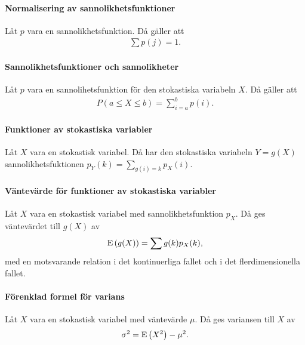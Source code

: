 \paragraph{Normalisering av sannolikhetsfunktioner}
Låt $p$ vara en sannolikhetsfunktion. Då gäller att
\begin{align*}
	\sum p(j) = 1.
\end{align*}

\proof

\paragraph{Sannolikhetsfunktioner och sannolikheter}
Låt $p$ vara en sannolihetsfunktion för den stokastiska variabeln $X$. Då gäller att
\begin{align*}
	P(a\leq X\leq b) = \sum\limits_{i = a}^{b}p(i).
\end{align*}

\proof

\paragraph{Funktioner av stokastiska variabler}
Låt $X$ vara en stokastisk variabel. Då har den stokastiska variabeln $Y = g(X)$ sannolikhetsfuktionen $p_{Y}(k) = \sum\limits_{g(i) = k}p_{X}(i)$.

\proof

\paragraph{Väntevärde för funktioner av stokastiska variabler}
Låt $X$ vara en stokastisk variabel med sannolikhetsfunktion $p_{X}$. Då ges väntevärdet till $g(X)$ av
\begin{align*}
	\text{E}\left(g(X)\right) = \sum g(k)p_{X}(k),
\end{align*}
med en motsvarande relation i det kontinuerliga fallet och i det flerdimensionella fallet.

\proof

\paragraph{Förenklad formel för varians}
Låt $X$ vara en stokastisk variabel med väntevärde $\mu$. Då ges variansen till $X$ av
\begin{align*}
	\sigma^2 = \text{E}\left(X^2\right) - \mu^2.
\end{align*}

\proof

